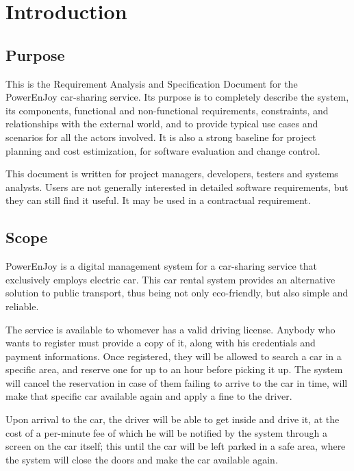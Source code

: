 \section{Introduction}\label{sec introduction}

\subsection{Purpose}

This is the  Requirement Analysis and Specification Document for the PowerEnJoy car-sharing service.
Its purpose is to completely describe the system, its components, functional and non-functional requirements, constraints, and relationships with the external world, and to provide typical use cases and scenarios for all the actors involved. It is also a strong baseline for project planning and cost estimization, for software evaluation and change control.


This document is written for project managers, developers, testers and systems analysts. Users are not generally interested in detailed software requirements, but they can still find it useful. It may be used in a contractual requirement.

\subsection{Scope}

PowerEnJoy is a digital management system for a car-sharing service that exclusively employs electric car. This car rental system provides an alternative solution to public transport, thus being not only eco-friendly, but also simple and reliable.

The service is available to whomever has a valid driving license. Anybody who wants to register must provide a copy of it, along with his credentials and payment informations.
Once registered, they will be allowed to search a car in a specific area, and reserve one for up to an hour before picking it up. The system will cancel the reservation in case of them failing to arrive to the car in time, will make that specific car available again and apply a fine to the driver.

Upon arrival to the car, the driver will be able to get inside and drive it, at the cost of a per-minute fee of which he will be notified by the system through a screen on the car itself; this until the car will be left parked in a safe area, where the system will close the doors and make the car available again.

